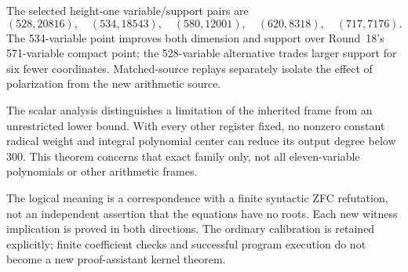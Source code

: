 The selected height-one variable/support pairs are
\[
 (528,20816),\quad(534,18543),\quad(580,12001),\quad
 (620,8318),\quad(717,7176).
\]
The 534-variable point improves both dimension and support over Round~18's
571-variable compact point; the 528-variable alternative trades larger
support for six fewer coordinates. Matched-source replays separately isolate
the effect of polarization from the new arithmetic source.

The scalar analysis distinguishes a limitation of the inherited frame from
an unrestricted lower bound. With every other register fixed, no nonzero
constant radical weight and integral polynomial center can reduce its output
degree below 300. This theorem concerns that exact family only, not all
eleven-variable polynomials or other arithmetic frames.

The logical meaning is a correspondence with a finite syntactic ZFC
refutation, not an independent assertion that the equations have no roots.
Each new witness implication is proved in both directions. The ordinary
calibration is retained explicitly; finite coefficient checks and successful
program execution do not become a new proof-assistant kernel theorem.

